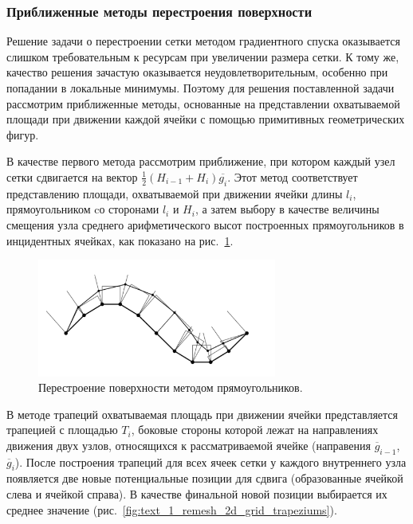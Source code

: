 \subsubsection{Приближенные методы перестроения поверхности}

Решение задачи о перестроении сетки методом градиентного спуска оказывается слишком требовательным к ресурсам при увеличении размера сетки.
К тому же, качество решения зачастую оказывается неудовлетворительным, особенно при попадании в локальные минимумы.
Поэтому для решения поставленной задачи рассмотрим приближенные методы, основанные на представлении охватываемой площади при движении каждой ячейки с помощью примитивных геометрических фигур.

В качестве первого метода рассмотрим приближение, при котором каждый узел сетки сдвигается на вектор $\frac{1}{2}(H_{i - 1} + H_i)\overline{g_i}$.
Этот метод соответствует представлению площади, охватываемой при движении ячейки длины $l_i$, прямоугольником cо сторонами $l_i$ и $H_i$, а затем выбору в качестве величины смещения узла среднего арифметического высот построенных прямоугольников в инцидентных ячейках, как показано на рис.~\ref{fig:text_1_remesh_2d_grid_rectangles}.

\begin{figure}[h]
\onelinecaptionstrue
\centering
\includegraphics[width=0.7\textwidth]{pics/text_1_remesh_2d/grid_rectangles.pdf}
\caption{Перестроение поверхности методом прямоугольников.}
\label{fig:text_1_remesh_2d_grid_rectangles}
\end{figure}

В методе трапеций охватываемая площадь при движении ячейки представляется трапецией с площадью $T_i$, боковые стороны которой лежат на направлениях движения двух узлов, относящихся к рассматриваемой ячейке (направения $\overline{g}_{i - 1}$, $\overline{g}_i$).
После построения трапеций для всех ячеек сетки у каждого внутреннего узла появляется две новые потенциальные позиции для сдвига (образованные ячейкой слева и ячейкой справа).
В качестве финальной новой позиции выбирается их среднее значение (рис.~\ref{fig:text_1_remesh_2d_grid_trapeziums}).

